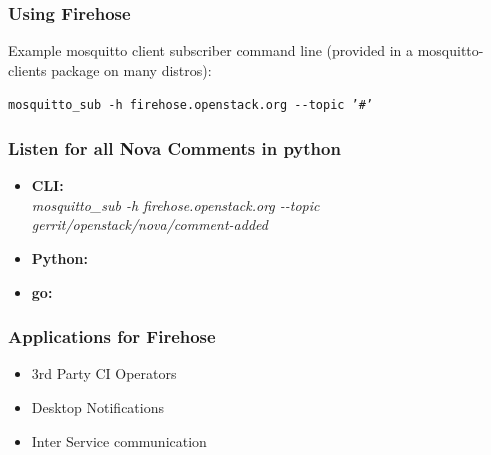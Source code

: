 \documentclass[aspectratio=169,11pt,hyperref={colorlinks=true}]{beamer}
\begin{document}
\begin{frame}
    \frametitle{Using Firehose}
    Example mosquitto client subscriber command line (provided in a
mosquitto-clients package on many distros):

    \begin{center}
        \texttt{mosquitto\_sub \--h firehose.openstack.org \--\--topic '\#'}
    \end{center}
\end{frame}

\begin{frame}
    \frametitle{Listen for all Nova Comments in python}
    \begin{itemize}
        \item \textbf{CLI:}\\
            \textit{mosquitto\_sub \--h firehose.openstack.org \--\--topic gerrit/openstack/nova/comment-added}
        \item \textbf{Python:}\\
            
    \end{itemize}
\end{frame}

\begin{frame}
    \begin{itemize}
        \item \textbf{go:} \\
            
    \end{itemize}
\end{frame}

\begin{frame}
    \frametitle{Applications for Firehose}
    \begin{itemize}
        \item 3rd Party CI Operators
        \item Desktop Notifications
        \item Inter Service communication
    \end{itemize}
\end{frame}
\end{document}
